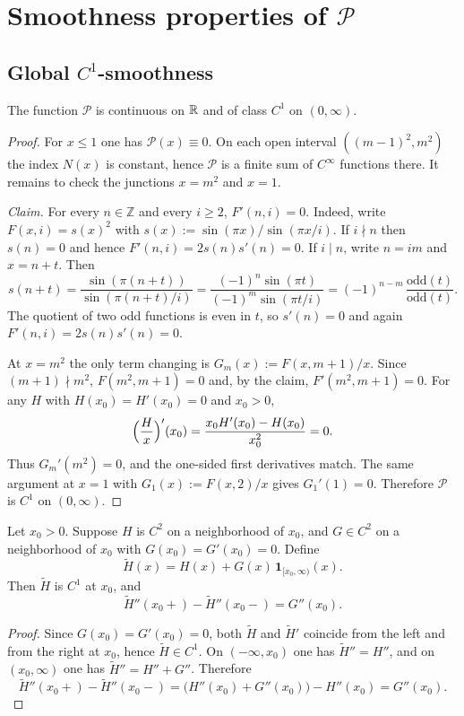\section{Smoothness properties of $\mathcal{P}$}

\subsection{Global $C^{1}$-smoothness}

\begin{proposition}\label{prop:C1}
The function $\mathcal{P}$ is continuous on $\mathbb{R}$ and of class $C^1$ on $(0,\infty)$.
\end{proposition}

\begin{proof}
For $x\le 1$ one has $\mathcal P(x)\equiv 0$. On each open interval $((m-1)^2,m^2)$ the index $N(x)$ is constant, hence $\mathcal P$ is a finite sum of $C^\infty$ functions there. It remains to check the junctions $x=m^2$ and $x=1$.

\emph{Claim.} For every $n\in\mathbb Z$ and every $i\ge 2$, $F'(n,i)=0$. Indeed, write $F(x,i)=s(x)^2$ with $s(x):=\sin(\pi x)/\sin(\pi x/i)$. If $i\nmid n$ then $s(n)=0$ and hence $F'(n,i)=2s(n)s'(n)=0$. If $i\mid n$, write $n=im$ and $x=n+t$. Then
\[
s(n+t)=\frac{\sin(\pi(n+t))}{\sin(\pi(n+t)/i)}
=\frac{(-1)^n\sin(\pi t)}{(-1)^m\sin(\pi t/i)}
=(-1)^{n-m}\,\frac{\text{odd}(t)}{\text{odd}(t)}.
\]
The quotient of two odd functions is even in $t$, so $s'(n)=0$ and again $F'(n,i)=2s(n)s'(n)=0$.

At $x=m^2$ the only term changing is $G_m(x):=F(x,m{+}1)/x$. Since $(m{+}1)\nmid m^2$, $F(m^2,m{+}1)=0$ and, by the claim, $F'(m^2,m{+}1)=0$. For any $H$ with $H(x_0)=H'(x_0)=0$ and $x_0>0$,
\[
\Bigl(\frac{H}{x}\Bigr)'(x_0)=\frac{x_0H'(x_0)-H(x_0)}{x_0^2}=0.
\]
Thus $G_m'(m^2)=0$, and the one-sided first derivatives match. The same argument at $x=1$ with $G_1(x):=F(x,2)/x$ gives $G_1'(1)=0$. Therefore $\mathcal P$ is $C^1$ on $(0,\infty)$.
\end{proof}


\begin{lemma}\label{lem:heaviside-junction}
Let $x_0>0$. Suppose $H$ is $C^2$ on a neighborhood of $x_0$, and $G\in C^2$ on a neighborhood of $x_0$ with $G(x_0)=G'(x_0)=0$. Define
\[
\widetilde H(x)=H(x)+G(x)\,\mathbf 1_{[x_0,\infty)}(x).
\]
Then $\widetilde H$ is $C^1$ at $x_0$, and
\[
\widetilde H''(x_0{+})-\widetilde H''(x_0{-})=G''(x_0).
\]

\begin{proof}
Since $G(x_0)=G'(x_0)=0$, both $\widetilde H$ and $\widetilde H'$ coincide from the left and from the right at $x_0$, hence $\widetilde H\in C^1$. On $(-\infty,x_0)$ one has $\widetilde H''=H''$, and on $(x_0,\infty)$ one has $\widetilde H''=H''+G''$. Therefore
\[
\widetilde H''(x_0{+})-\widetilde H''(x_0{-})=\bigl(H''(x_0)+G''(x_0)\bigr)-H''(x_0)=G''(x_0).
\]
\end{proof}
\end{lemma}

